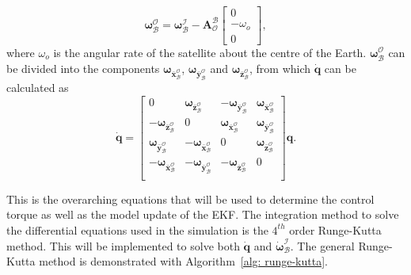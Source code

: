 \begin{equation}
\boldsymbol{\omega}_{\mathcal{B}}^{\mathcal{O}} = \boldsymbol{\omega}_{\mathcal{B}}^{\mathcal{I}} - \boldsymbol{A}^{\mathcal{B}}_{\mathcal{O}} 
\begin{bmatrix}
	0 \\ -\omega_o \\ 0
\end{bmatrix},
\end{equation}
where $\omega_o$ is the angular rate of the satellite about the centre of the Earth. $\boldsymbol{\omega}_{\mathcal{B}}^{\mathcal{O}}$ can be divided into the components $\boldsymbol{\omega}_{\bar{\mathbf{x}}_{\mathcal{B}}^{\mathcal{O}}}$, $\boldsymbol{\omega}_{\bar{\mathbf{y}}_{\mathcal{B}}^{\mathcal{O}}}$ and $\boldsymbol{\omega}_{\bar{\mathbf{z}}_{\mathcal{B}}^{\mathcal{O}}}$, from which $\dot{\mathbf{q}}$ can be calculated as
\begin{equation}
	\mathbf{\dot{q}} = 
\begin{bmatrix}
	0 & \boldsymbol{\omega}_{\bar{\mathbf{z}}_{\mathcal{B}}^{\mathcal{O}}} & -\boldsymbol{\omega}_{\bar{\mathbf{y}}_{\mathcal{B}}^{\mathcal{O}}} & \boldsymbol{\omega}_{\bar{\mathbf{x}}_{\mathcal{B}}^{\mathcal{O}}} \\
	-\boldsymbol{\omega}_{\bar{\mathbf{z}}_{\mathcal{B}}^{\mathcal{O}}} & 0 & \boldsymbol{\omega}_{\bar{\mathbf{x}}_{\mathcal{B}}^{\mathcal{O}}} & \boldsymbol{\omega}_{\bar{\mathbf{y}}_{\mathcal{B}}^{\mathcal{O}}} \\
	\boldsymbol{\omega}_{\bar{\mathbf{y}}_{\mathcal{B}}^{\mathcal{O}}} & -\boldsymbol{\omega}_{\bar{\mathbf{x}}_{\mathcal{B}}^{\mathcal{O}}} & 0 & \boldsymbol{\omega}_{\bar{\mathbf{z}}_{\mathcal{B}}^{\mathcal{O}}} \\
	-\boldsymbol{\omega}_{\bar{\mathbf{x}}_{\mathcal{B}}^{\mathcal{O}}} & -\boldsymbol{\omega}_{\bar{\mathbf{y}}_{\mathcal{B}}^{\mathcal{O}}} & -\boldsymbol{\omega}_{\bar{\mathbf{z}}_{\mathcal{B}}^{\mathcal{O}}} & 0 \\
\end{bmatrix} \mathbf{q}.
\end{equation}

This is the overarching equations that will be used to determine the control torque as well as the model update of the EKF. The integration method to solve the differential equations used in the simulation is the $4^{th}$ order Runge-Kutta method. This will be implemented to solve both $\mathbf{\dot{q}}$ and $\boldsymbol{\dot{\omega}}_{\mathcal{B}}^{\mathcal{I}}$. The general Runge-Kutta method is demonstrated with Algorithm~\ref{alg: runge-kutta}.

